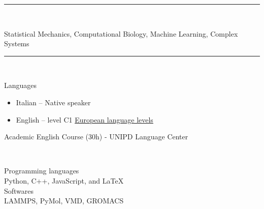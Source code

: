 \documentclass[a4paper,10pt]{article}
\newlength{\cvcolumngapwidth}
\newlength{\cvleftcolumnwidth}
\newlength{\cvrightcolumnwidth}
\newcommand{\cvsectionstyle}[1]{{\normalsize\cvsectionfont\textcolor{cvsectioncolor}{#1}}}
\newcommand{\cvdurationstyle}[1]{{\small\cvdurationfont\textcolor{cvdurationcolor}{#1}}}
\newcommand{\cvheadingstyle}[1]{{\normalsize\cvheadingfont\textcolor{cvheadingcolor}{#1}}}
\newlength{\cvafteritemskipamount}
\newlength{\cvaftersectionskipamount}
\newlength{\cvbetweensectionandheadingextraskipamount}
\newlength{\cvparskip}
\newcommand{\cvsection}[1]{
    \begin{minipage}[t]{\cvleftcolumnwidth}
        \raggedleft\cvsectionstyle{#1}
    \end{minipage}%
    \hspace{\cvcolumngapwidth}%
    \begin{minipage}[t]{\cvrightcolumnwidth}
        \textcolor{cvrulecolor}{\rule{\cvrightcolumnwidth}{0.3mm}}
    \end{minipage}

    \vspace{\cvaftersectionskipamount}
}
\newcommand{\cvitem}[2]{
    \begin{minipage}[t]{\cvleftcolumnwidth}
        \raggedleft #1
    \end{minipage}%
    \hspace{\cvcolumngapwidth}%
    \begin{minipage}[t]{\cvrightcolumnwidth}
        \setlength{\parskip}{\cvparskip} #2
    \end{minipage}

    \vspace{\cvafteritemskipamount}
}
\begin{document}

\cvsection{MAJOR RESEARCH INTERESTS}

\cvitem{
    \ 
    }{
        Statistical Mechanics, Computational Biology, Machine Learning, Complex Systems
        }
        
        
\newpage

\cvsection{SKILLS}

\vspace{\cvbetweensectionandheadingextraskipamount}

\cvitem{
    \ 
}{
    \cvheadingstyle{Languages}
    \begin{itemize}[leftmargin=*]
        \item Italian -- Native speaker
        \item English -- level C1
        \cvdurationstyle{\href{https://europass.cedefop.europa.eu/it/resources/european-language-levels-cefr}{European language levels}}      
    \end{itemize} 
    Academic English Course (30h) - UNIPD Language Center  
    
}

\cvitem{
    \ 
}{
    \cvheadingstyle{Programming languages}\\
    Python, C++, JavaScript, and \LaTeX\\

    \cvheadingstyle{Softwares}\\
    LAMMPS, PyMol, VMD, GROMACS
    
}
\end{document}
